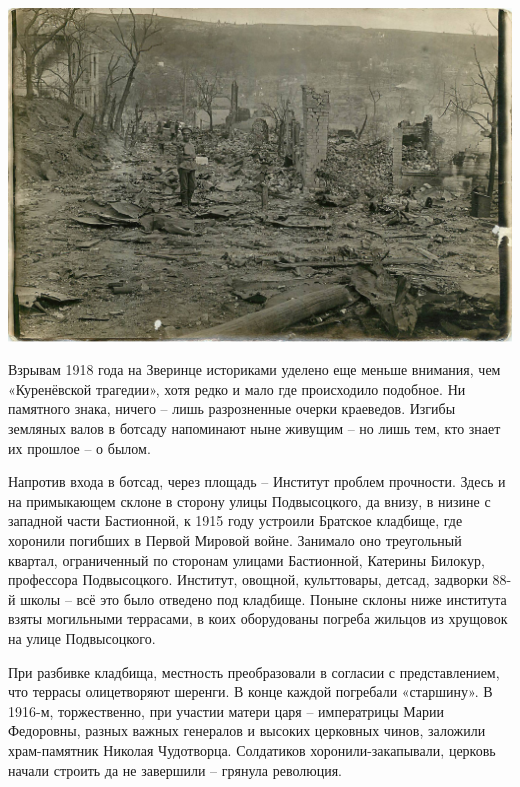 \begin{center}
\includegraphics[width=\textwidth]{chast-vosp/zver/902_001.jpg}
\end{center}


Взрывам 1918 года на Зверинце историками уделено еще меньше внимания, чем «Куренёвской трагедии», хотя редко и мало где происходило подобное. Ни памятного знака, ничего – лишь разрозненные очерки краеведов. Изгибы земляных валов в ботсаду напоминают ныне живущим – но лишь тем, кто знает их прошлое – о былом.

Напротив входа в ботсад, через площадь – Институт проблем прочности. Здесь и на примыкающем склоне в сторону улицы Подвысоцкого, да внизу, в низине с западной части Бастионной, к 1915 году устроили Братское кладбище, где хоронили погибших в Первой Мировой войне. Занимало оно треугольный квартал, ограниченный по сторонам улицами Бастионной, Катерины Билокур, профессора Подвысоцкого. Институт, овощной, культтовары, детсад, задворки 88-й школы – всё это было отведено под кладбище. Поныне склоны ниже института взяты могильными террасами, в коих оборудованы погреба жильцов из хрущовок на улице Подвысоцкого.

При разбивке кладбища, местность преобразовали в согласии с представлением, что террасы олицетворяют шеренги. В конце каждой погребали «старшину». В 1916-м, торжественно, при участии матери царя – императрицы Марии Федоровны, разных важных генералов и высоких церковных чинов, заложили храм-памятник Николая Чудотворца. Солдатиков хоронили-закапывали, церковь начали строить да не завершили – грянула революция.

